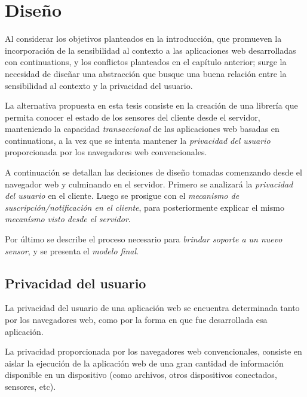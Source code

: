 
\chapter{Diseño}
\label{Capitulo 4}

Al considerar los objetivos planteados en la introducción, que promueven la incorporación de la sensibilidad al contexto a las aplicaciones web desarrolladas con continuations, y los conflictos planteados en el capítulo anterior; surge la necesidad de diseñar una abstracción que busque una buena relación entre la sensibilidad al contexto y la privacidad del usuario.

La alternativa propuesta en esta tesis consiste en la creación de una librería que permita conocer el estado de los sensores del cliente desde el servidor, manteniendo la capacidad \emph{transaccional} de las aplicaciones web basadas en continuations, a la vez que se intenta mantener la \emph{privacidad del usuario} proporcionada por los navegadores web convencionales.

A continuación se detallan las decisiones de diseño tomadas comenzando desde el navegador web y culminando en el servidor. Primero se analizará la \emph{privacidad del usuario} en el cliente. Luego se prosigue con el \emph{mecanismo de suscripción/notificación en el cliente}, para posteriormente explicar el mismo \emph{mecanísmo visto desde el servidor}.

Por último se describe el proceso necesario para \emph{brindar soporte a un nuevo sensor}, y se presenta el \emph{modelo final}.


\section{Privacidad del usuario}

La privacidad del usuario de una aplicación web se encuentra determinada tanto por los navegadores web, como por la forma en que fue desarrollada esa aplicación.

La privacidad proporcionada por los navegadores web convencionales, consiste en aislar la ejecución de la aplicación web de una gran cantidad de información disponible en un dispositivo (como archivos, otros dispositivos conectados, sensores, etc).

